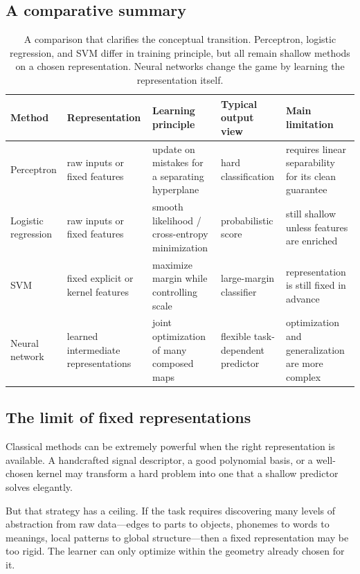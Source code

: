\subsection*{A comparative summary}

\begin{table}[tbp]
\centering
\renewcommand{\arraystretch}{1.25}
\begin{tabular}{p{2.5cm}p{2.6cm}p{3.0cm}p{2.5cm}p{2.2cm}}
\toprule
\textbf{Method} & \textbf{Representation} & \textbf{Learning principle} & \textbf{Typical output view} & \textbf{Main limitation} \\
\midrule
Perceptron
& raw inputs or fixed features
& update on mistakes for a separating hyperplane
& hard classification
& requires linear separability for its clean guarantee \\
\addlinespace
Logistic regression
& raw inputs or fixed features
& smooth likelihood / cross-entropy minimization
& probabilistic score
& still shallow unless features are enriched \\
\addlinespace
SVM
& fixed explicit or kernel features
& maximize margin while controlling scale
& large-margin classifier
& representation is still fixed in advance \\
\addlinespace
Neural network
& learned intermediate representations
& joint optimization of many composed maps
& flexible task-dependent predictor
& optimization and generalization are more complex \\
\bottomrule
\end{tabular}
\caption{A comparison that clarifies the conceptual transition. Perceptron, logistic regression, and SVM differ in training principle, but all remain shallow methods on a chosen representation. Neural networks change the game by learning the representation itself.}
\end{table}

\subsection*{The limit of fixed representations}

Classical methods can be extremely powerful when the right representation is available. A handcrafted signal descriptor, a good polynomial basis, or a well-chosen kernel may transform a hard problem into one that a shallow predictor solves elegantly.

But that strategy has a ceiling. If the task requires discovering many levels of abstraction from raw data---edges to parts to objects, phonemes to words to meanings, local patterns to global structure---then a fixed representation may be too rigid. The learner can only optimize within the geometry already chosen for it.

